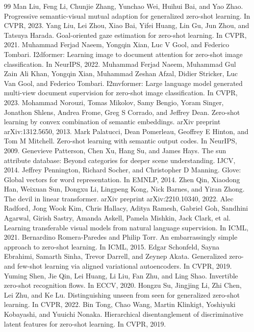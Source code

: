 \begin{thebibliography}{99}
 Man Liu, Feng Li, Chunjie Zhang, Yunchao Wei, Huihui Bai, and Yao Zhao. Progressive semantic-visual mutual adaption for generalized zero-shot learning. In CVPR, 2023.
 Yang Liu, Lei Zhou, Xiao Bai, Yifei Huang, Lin Gu, Jun Zhou, and Tatsuya Harada. Goal-oriented gaze estimation for zero-shot learning. In CVPR, 2021.
 Muhammad Ferjad Naeem, Yongqin Xian, Luc V Gool, and Federico Tombari. I2dformer: Learning image to document attention for zero-shot image classification. In NeurIPS, 2022.
 Muhammad Ferjad Naeem, Muhammad Gul Zain Ali Khan, Yongqin Xian, Muhammad Zeshan Afzal, Didier Stricker, Luc Van Gool, and Federico Tombari. I2mvformer: Large language model generated multi-view document supervision for zero-shot image classification. In CVPR, 2023.
 Mohammad Norouzi, Tomas Mikolov, Samy Bengio, Yoram Singer, Jonathon Shlens, Andrea Frome, Greg S Corrado, and Jeffrey Dean. Zero-shot learning by convex combination of semantic embeddings. arXiv preprint arXiv:1312.5650, 2013.
 Mark Palatucci, Dean Pomerleau, Geoffrey E Hinton, and Tom M Mitchell. Zero-shot learning with semantic output codes. In NeurIPS, 2009.
 Genevieve Patterson, Chen Xu, Hang Su, and James Hays. The sun attribute database: Beyond categories for deeper scene understanding. IJCV, 2014.
 Jeffrey Pennington, Richard Socher, and Christopher D Manning. Glove: Global vectors for word representation. In EMNLP, 2014.
 Zhen Qin, Xiaodong Han, Weixuan Sun, Dongxu Li, Lingpeng Kong, Nick Barnes, and Yiran Zhong. The devil in linear transformer. arXiv preprint arXiv:2210.10340, 2022.
 Alec Radford, Jong Wook Kim, Chris Hallacy, Aditya Ramesh, Gabriel Goh, Sandhini Agarwal, Girish Sastry, Amanda Askell, Pamela Mishkin, Jack Clark, et al. Learning transferable visual models from natural language supervision. In ICML, 2021.
 Bernardino Romera-Paredes and Philip Torr. An embarrassingly simple approach to zero-shot learning. In ICML, 2015.
 Edgar Schonfeld, Sayna Ebrahimi, Samarth Sinha, Trevor Darrell, and Zeynep Akata. Generalized zero-and few-shot learning via aligned variational autoencoders. In CVPR, 2019.
 Yuming Shen, Jie Qin, Lei Huang, Li Liu, Fan Zhu, and Ling Shao. Invertible zero-shot recognition flows. In ECCV, 2020.
 Hongzu Su, Jingjing Li, Zhi Chen, Lei Zhu, and Ke Lu. Distinguishing unseen from seen for generalized zero-shot learning. In CVPR, 2022.
 Bin Tong, Chao Wang, Martin Klinkigt, Yoshiyuki Kobayashi, and Yuuichi Nonaka. Hierarchical disentanglement of discriminative latent features for zero-shot learning. In CVPR, 2019.

\end{thebibliography}

